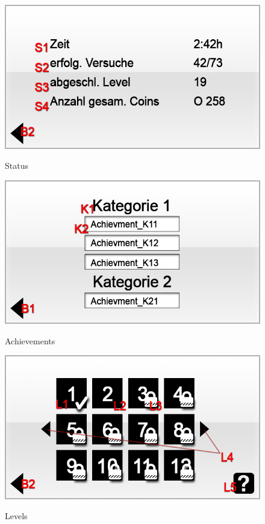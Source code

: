 \begin{figure}[H]
\centering
{}\label{fig:Status}
\includegraphics[scale=0.55]{../GUI-Entwurf/_jpeg_numeration/stat.jpg}
\caption{Status}
\end{figure}

\begin{figure}[H]
\centering
{}\label{fig:achievments}
\includegraphics[scale=0.55]{../GUI-Entwurf/_jpeg_numeration/achievments.jpg}
\caption{Achievements}
\end{figure}

\begin{figure}[H]
\centering
{}\label{fig:level}
\includegraphics[scale=0.55]{../GUI-Entwurf/_jpeg_numeration/level.jpg}
\caption{Levels}
\end{figure}

